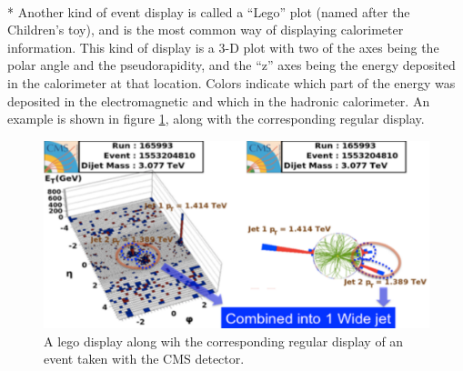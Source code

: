 \\*
Another kind of event display is called a ``Lego'' plot (named after the Children's toy), and is the most common way of displaying calorimeter information.  This kind of display is a 3-D plot with two of the axes being the polar angle and the pseudorapidity, and the ``z'' axes being the energy deposited in the calorimeter at that location. Colors indicate which part of the energy was deposited in the electromagnetic and which in the hadronic calorimeter. An example is shown in figure \ref{fig:pid3}, along with the corresponding regular display.
\begin{figure}[h]
\centering\includegraphics[scale=0.5]{./particleID/Pictures/fig3.pdf}
\caption{A lego display along wih the corresponding regular display of an event taken with the CMS detector.}
\label{fig:pid3}
\end{figure}

